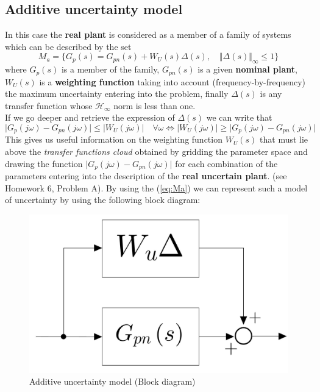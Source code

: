 \documentclass[a4paper, 12pt]{article}
\begin{document}
    \subsection{Additive uncertainty model}
    In this case the \textbf{real plant} is considered as a member of a family of systems which can be described by the set 
    \begin{equation}\label{eq:Ma}
        M_a = \{
            G_p(s)=G_{pn}(s)+W_U(s)\Delta(s), \quad \Vert \Delta(s) \Vert_\infty \le 1 
        \}
    \end{equation}
    where $G_p(s)$ is a member of the family, $G_{pn}(s)$ is a given \textbf{nominal plant}, $W_U(s)$ is a \textbf{weighting function} taking into account (frequency-by-frequency) the maximum uncertainty entering into the problem, finally $\Delta(s)$ is any transfer function whose $\mathcal{H}_\infty$ norm is less than one.\\
    If we go deeper and retrieve the expression of $\Delta(s)$ we can write that
    \begin{equation}\label{eq:cloud_a}
        \vert G_p(j\omega)-G_{pn}(j\omega)    \vert \le \vert W_U(j\omega) \vert \quad \forall \omega \iff
        \vert W_U(j\omega) \vert   \ge  \vert G_p(j\omega)-G_{pn}(j\omega)    \vert
    \end{equation}
    This gives us useful information on the weighting function $W_U(s)$ that must lie above the \textit{transfer functions cloud} obtained by gridding the parameter space and drawing the function $\vert G_p(j\omega)-G_{pn}(j\omega) \vert$ for each combination of the parameters entering into the description of the \textbf{real uncertain plant}. (see Homework 6, \textsf{Problem A}).
    By using the (\ref{eq:Ma}) we can represent such a model of uncertainty by using the following block diagram:

    \begin{figure}
        \centering
        \includegraphics[scale=0.2]{img/Additive.jpeg}
        \caption{Additive uncertainty model (Block diagram)}
    \end{figure}
\end{document}

